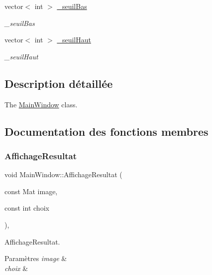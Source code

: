 \begin{DoxyCompactItemize}
\mbox{\label{classMainWindow_aee7331f7bf3b93d7992c57688ce5a181}} 
vector$<$ int $>$ \hyperlink{classMainWindow_aee7331f7bf3b93d7992c57688ce5a181}{\+\_\+seuil\+Bas}
\begin{DoxyCompactList}\small\item\em \+\_\+seuil\+Bas \end{DoxyCompactList}\item 
\mbox{\label{classMainWindow_a3f1d161a1e50f63886103e22630212fb}} 
vector$<$ int $>$ \hyperlink{classMainWindow_a3f1d161a1e50f63886103e22630212fb}{\+\_\+seuil\+Haut}
\begin{DoxyCompactList}\small\item\em \+\_\+seuil\+Haut \end{DoxyCompactList}\end{DoxyCompactItemize}


\subsection{Description détaillée}
The \hyperlink{classMainWindow}{Main\+Window} class. 

\subsection{Documentation des fonctions membres}
\mbox{\label{classMainWindow_a6a5fc1b965e50e296003a94a73fea202}} 
\subsubsection{\texorpdfstring{Affichage\+Resultat}{AffichageResultat}}
{\footnotesize\ttfamily void Main\+Window\+::\+Affichage\+Resultat (\begin{DoxyParamCaption}\item[{const Mat}]{image,  }\item[{const int}]{choix }\end{DoxyParamCaption})\hspace{0.3cm}{\ttfamily [private]}, {\ttfamily [slot]}}



Affichage\+Resultat. 


\begin{DoxyParams}{Paramètres}
{\em image} & \\
\hline
{\em choix} & \\
\hline
\end{DoxyParams}
\mbox{\label{classMainWindow_a99e8722ec23f19c1d8bda4d38e06435c}} 
